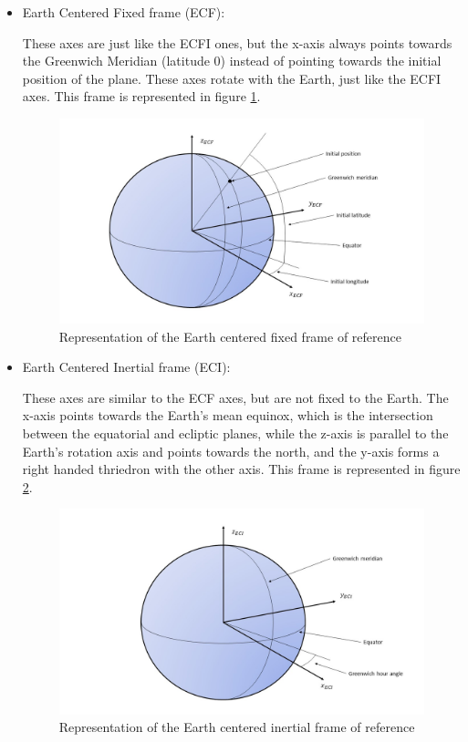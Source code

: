 \begin{itemize}
\item Earth Centered Fixed frame (ECF): 

These axes are just like the ECFI ones, but the x-axis always points towards the Greenwich Meridian (latitude 0) instead of pointing towards the initial position of the plane. These axes rotate with the Earth, just like the ECFI axes. This frame is represented in figure \ref{fig:ECF_frame}.

\begin{figure}
\centering
\includegraphics[scale=0.4]{Images/ECF_frame.jpg}
\caption{Representation of the Earth centered fixed frame of reference}
\label{fig:ECF_frame}
\end{figure}

\item Earth Centered Inertial frame (ECI): 

These axes are similar to the ECF axes, but are not fixed to the Earth. The x-axis points towards the Earth's mean equinox, which is the intersection between the equatorial and ecliptic planes, while the z-axis is parallel to the Earth's rotation axis and points towards the north, and the y-axis forms a right handed thriedron with the other axis. This frame is represented in figure \ref{fig:ECI_frame}. 

\begin{figure}
\centering
\includegraphics[scale=0.4]{Images/ECI_frame.jpg}
\caption{Representation of the Earth centered inertial frame of reference}
\label{fig:ECI_frame}
\end{figure}

\end{itemize}
